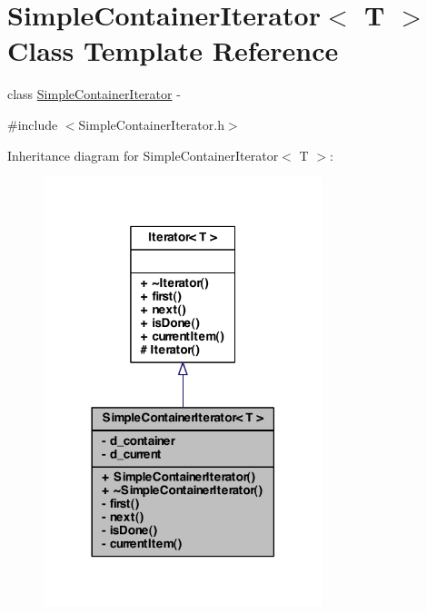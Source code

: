 \hypertarget{class_simple_container_iterator}{
\section{SimpleContainerIterator$<$ T $>$ Class Template Reference}
\label{class_simple_container_iterator}
}


class \hyperlink{class_simple_container_iterator}{SimpleContainerIterator} -\/  




{\ttfamily \#include $<$SimpleContainerIterator.h$>$}



Inheritance diagram for SimpleContainerIterator$<$ T $>$:\nopagebreak
\begin{figure}[H]
\begin{center}
\leavevmode
\includegraphics[width=230pt]{class_simple_container_iterator__inherit__graph}
\end{center}
\end{figure}


